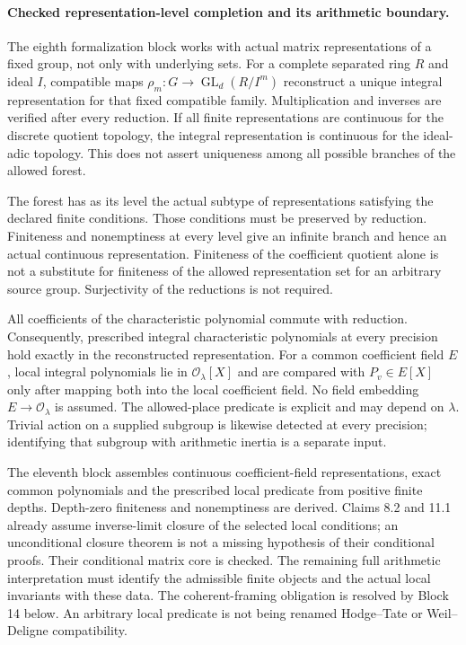 \documentclass[11pt]{article}
\theoremstyle{definition}
\theoremstyle{remark}
\newcommand{\Ocal}{\mathcal O}
\begin{document}
\paragraph{Checked representation-level completion and its arithmetic boundary.}
The eighth formalization block works with actual matrix representations of a
fixed group, not only with underlying sets. For a complete separated ring $R$
and ideal $I$, compatible maps
$\rho_m:G\to\operatorname{GL}_d(R/I^m)$ reconstruct a unique integral
representation for that fixed compatible family. Multiplication and inverses
are verified after every reduction. If all finite representations are continuous
for the discrete quotient topology, the integral representation is continuous
for the ideal-adic topology. This does not assert uniqueness among all possible
branches of the allowed forest.

The forest has as its level the actual subtype of representations satisfying
the declared finite conditions. Those conditions must be preserved by reduction.
Finiteness and nonemptiness at every level give an infinite branch and hence an
actual continuous representation. Finiteness of the coefficient quotient alone
is not a substitute for finiteness of the allowed representation set for an
arbitrary source group. Surjectivity of the reductions is not required.

All coefficients of the characteristic polynomial commute with reduction.
Consequently, prescribed integral characteristic polynomials at every precision
hold exactly in the reconstructed representation. For a common coefficient field
$E$, local integral polynomials lie in $\Ocal_\lambda[X]$ and are compared with
$P_v\in E[X]$ only after mapping both into the local coefficient field. No field
embedding $E\to\Ocal_\lambda$ is assumed. The allowed-place predicate is explicit
and may depend on $\lambda$. Trivial action on a supplied subgroup is likewise
detected at every precision; identifying that subgroup with arithmetic inertia
is a separate input.

The eleventh block assembles continuous coefficient-field representations, exact
common polynomials and the prescribed local predicate from positive finite
depths. Depth-zero finiteness and nonemptiness are derived. Claims 8.2 and 11.1
already assume inverse-limit closure of the selected local conditions; an
unconditional closure theorem is not a missing hypothesis of their conditional
proofs. Their conditional matrix core is checked. The remaining full arithmetic
interpretation must identify the admissible finite objects and the actual local
invariants with these data. The coherent-framing obligation is resolved by Block 14
below. An arbitrary local
predicate is not being renamed Hodge--Tate or Weil--Deligne compatibility.
\end{document}
